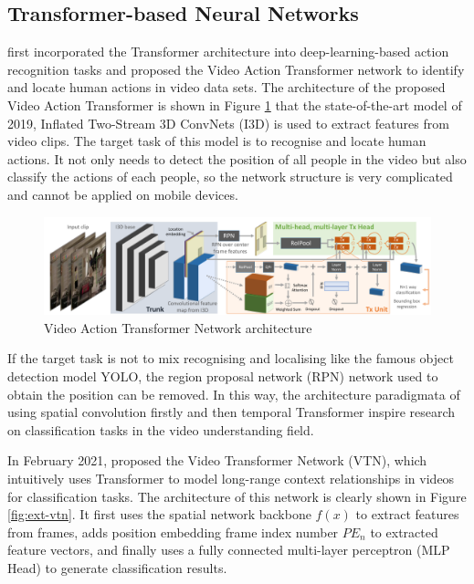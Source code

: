 \subsection{Transformer-based Neural Networks}
\citet{girdhar2019video} first incorporated the Transformer architecture into deep-learning-based action recognition tasks and proposed the Video Action Transformer network to identify and locate human actions in video data sets.
The architecture of the proposed Video Action Transformer is shown in Figure \ref{fig:ext-vatn} that the state-of-the-art model of 2019, Inflated Two-Stream 3D ConvNets (I3D) is used to extract features from video clips.
The target task of this model is to recognise and locate human actions.
It not only needs to detect the position of all people in the video but also classify the actions of each people, so the network structure is very complicated and cannot be applied on mobile devices.

\begin{figure}[!ht]
    \centering
    \includegraphics[width=\textwidth]{literature/imgs/ext-vatn.pdf}
    \caption{Video Action Transformer Network architecture \cite{girdhar2019video}}
    \label{fig:ext-vatn}
\end{figure}

If the target task is not to mix recognising and localising like the famous object detection model YOLO, the region proposal network (RPN) network used to obtain the position can be removed.
In this way, the architecture paradigmata of using spatial convolution firstly and then temporal Transformer inspire research on classification tasks in the video understanding field.

In February 2021, \citet{neimark2021video} proposed the Video Transformer Network (VTN), which intuitively uses Transformer to model long-range context relationships in videos for classification tasks.
The architecture of this network is clearly shown in Figure \ref{fig:ext-vtn}.
It first uses the spatial network backbone $f(x)$ to extract features from frames, adds position embedding frame index number $PE_n$ to extracted feature vectors, and finally uses a fully connected multi-layer perceptron (MLP Head) to generate classification results.

